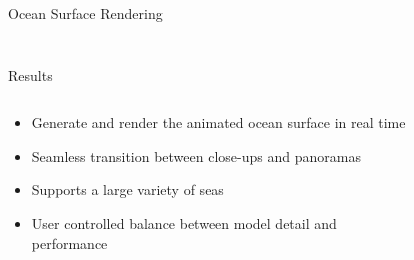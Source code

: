 \documentclass[final,hyperref={pdfpagelabels=true}]{beamer}
\begin{document}
\begin{frame}
\begin{center}
\begin{minipage}{0.99\textwidth}
\begin{block}{Ocean Surface Rendering}
\begin{columns}[t]
\begin{column}{0.95\linewidth}
\begin{figure}
					\end{figure}
				\end{column}
%					
%					
%					
%					
%					
			\end{columns}
		\end{block}
	\end{minipage}
	\begin{minipage}{0.99\textwidth}
		\begin{block}{Results}
			\begin{columns}[t]
				\begin{column}{0.4\linewidth}
				\begin{itemize}
				\item Generate and render the animated ocean surface in real time
				\item Seamless transition between close-ups and panoramas
				\item Supports a large variety of seas
				\item User controlled balance between model detail and performance
				\end{itemize}
				\end{column}
				\begin{column}{0.5\linewidth}
				\begin{figure}
				\centering
				\hfill

\end{figure}
\end{column}
\end{columns}
\end{block}
\end{minipage}
\end{center}
\end{frame}
\end{document}
